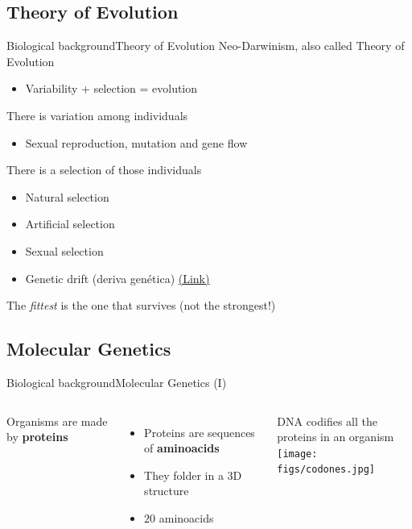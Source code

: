 \documentclass[10pt,compress]{beamer} %
\begin{document}
\subsection{Theory of Evolution}
\begin{frame}{Biological background}{Theory of Evolution}
	Neo-Darwinism, also called Theory of Evolution %
	\begin{itemize}
		\item Variability + selection = \alert{evolution}
	\end{itemize}
	There is variation among individuals
	\begin{itemize}
		\item Sexual reproduction, mutation and gene flow
  	\end{itemize}
	There is a selection of those individuals
	\begin{itemize}
		\item \alert{Natural selection}
		\item Artificial selection
		\item Sexual selection
		\item Genetic drift (deriva genética) \href{https://github.com/dfbarrero/aiCourse/blob/master/ecintro/figs/Genetic-Drift.png}{(Link)}
	\end{itemize}
	The \textit{fittest} is the one that survives (not the strongest!)
\end{frame}

\subsection{Molecular Genetics}
\begin{frame}{Biological background}{Molecular Genetics (I)}
    \begin{columns}
		Organisms are made by \textbf{proteins}

 	 	\begin{itemize}
		\item Proteins are sequences of \textbf{aminoacids}
		\item They folder in a 3D structure
		\item $20$ aminoacids
		\end{itemize}
		DNA codifies all the proteins in an organism\\
		\centering\texttt{[image: figs/codones.jpg]}
	\end{columns}
\end{frame}
\end{document}
